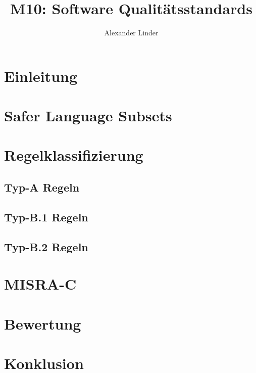 \documentclass[a4paper,UKenglish,cleveref, autoref]{templates/lipics-v2019}
\title{M10: Software Qualitätsstandards}
\author{Alexander Linder}{Karlsruhe Institute of Technology, Germany \and \url{https://kit.edu} }{alexander.linder@student.kit.edu}{}{}
\begin{document}
\maketitle

\begin{abstract}
\end{abstract}

\section{Einleitung}
\label{sec:einleitung}

\section{Safer Language Subsets}
\label{sec:safer-language-subsets}

\section{Regelklassifizierung}
\label{sec:regelklassifizierung}

\subsection{Typ-A Regeln}
\label{subsec:typ-a-regeln}

\subsection{Typ-B.1 Regeln}
\label{subsec:typ-b-1-regeln}

\subsection{Typ-B.2 Regeln}
\label{subsec:typ-b-2-regeln}

\section{MISRA-C}
\label{sec:misra-c}

\section{Bewertung}
\label{sec:bewertung}

\section{Konklusion}
\label{sec:konklusion}




\end{document}
